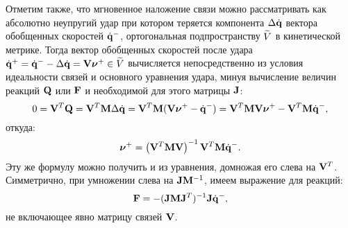 Отметим также, что мгновенное наложение связи можно рассматривать как абсолютно неупругий удар при котором теряется компонента $\Delta\dot{\mathbf{q}}$ вектора обобщенных скоростей $\dot{\mathbf{q}}^-$, ортогональная подпространству $\widetilde{V}$ в кинетической метрике.  Тогда вектор обобщенных скоростей после удара $\dot{\mathbf{q}}^+ = \dot{\mathbf{q}}^- - \Delta\dot{\mathbf{q}} = \mathbf{V}\boldsymbol{\mathbf{\nu}}^+ \in \widetilde{V}$ вычисляется непосредственно из условия идеальности связей и основного уравнения удара, минуя вычисление величин реакций $\mathbf{Q}$ или $\mathbf{F}$ и необходимой для этого матрицы $\mathbf{J}$:
\begin{equation*}
    0 = \mathbf{V}^T\mathbf{Q} = \mathbf{V}^T\mathbf{M}\Delta\dot{\mathbf{q}} = \mathbf{V}^T\mathbf{M}(\mathbf{V}\boldsymbol{\mathbf{\nu}}^+ - \dot{\mathbf{q}}^-) = \mathbf{V}^T\mathbf{M}\mathbf{V}\boldsymbol{\mathbf{\nu}}^+ - \mathbf{V}^T\mathbf{M}\dot{\mathbf{q}}^-,
\end{equation*}
откуда:
\begin{equation*}
\boldsymbol{\mathbf{\nu}}^+ = \left( \mathbf{V}^T\mathbf{M}\mathbf{V} \right)^{-1}\mathbf{V}^T\mathbf{M}\dot{\mathbf{q}}^-.
\end{equation*}
Эту же формулу можно получить и из уравнения, домножая его слева на $\mathbf{V}^T$. Симметрично, при умножении слева на $\mathbf{J}\mathbf{M}^{-1}$, имеем выражение для реакций:
\begin{equation*}
    \mathbf{F} = -(\mathbf{J} \mathbf{M} \mathbf{J}^T)^{-1}\mathbf{J}\dot{\mathbf{q}}^-,
\end{equation*}
не включающее явно матрицу связей $\mathbf{V}$.
